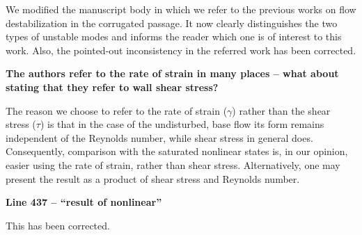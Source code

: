 \documentclass[a4paper,12pt]{article}
\begin{document}
\vspace*{20pt}
We modified the manuscript body in which we refer to the previous works on flow destabilization in the corrugated passage. It now clearly distinguishes the two types of unstable modes and informs the reader which one is of interest to this work. Also, the pointed-out inconsistency in the referred work has been corrected.  
\vspace*{20pt}

\newpage
{\bf The authors refer to the rate of strain in many places – what about stating that they refer to wall shear stress?}

\vspace*{20pt}
The reason we choose to refer to the rate of strain ($\gamma$) rather than the shear stress ($\tau$) is that in the case of the undisturbed, base flow its form remains independent of the Reynolds number, while shear stress in general does. Consequently, comparison with the saturated nonlinear states is, in our opinion, easier using the rate of strain, rather than shear stress. Alternatively, one may present the result as a product of shear stress and Reynolds number. 
\vspace*{20pt}

{\bf Line 437 – “result of nonlinear”}

\vspace*{20pt}
This has been corrected. 
\vspace*{20pt}
\end{document}

